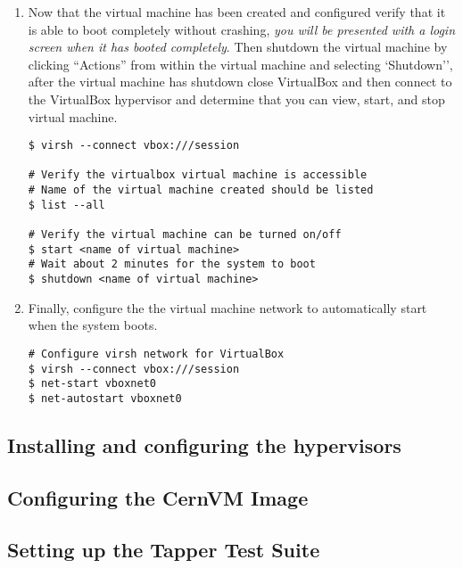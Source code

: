 \begin{enumerate}
\item	Now that the virtual machine has been created and configured verify that it is able to boot completely without crashing,
		\emph{you will be presented with a login screen when it has booted completely}. Then shutdown the virtual machine by clicking 
		``Actions'' from within the virtual machine and selecting `Shutdown'', after the virtual machine has shutdown close
		VirtualBox and then connect to the VirtualBox hypervisor and determine that you can view, start, and stop virtual machine.

\lstset{language=bash,caption=Verify VirtualBox Works with Virsh}
\begin{lstlisting}
$ virsh --connect vbox:///session

# Verify the virtualbox virtual machine is accessible
# Name of the virtual machine created should be listed
$ list --all

# Verify the virtual machine can be turned on/off
$ start <name of virtual machine>
# Wait about 2 minutes for the system to boot
$ shutdown <name of virtual machine>
\end{lstlisting}

\item	Finally, configure the the virtual machine network to automatically start when the system boots.

\lstset{language=bash,caption=Configure Network}
\begin{lstlisting}
# Configure virsh network for VirtualBox
$ virsh --connect vbox:///session
$ net-start vboxnet0
$ net-autostart vboxnet0
\end{lstlisting}				
\end{enumerate}




\newpage
\subsection{Installing and configuring the hypervisors}
\subsection{Configuring the CernVM Image}
\subsection{Setting up the Tapper Test Suite}